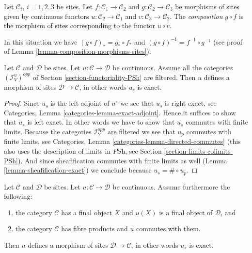 \begin{definition}
\label{definition-composition-morphisms-sites}
Let $\mathcal{C}_i$, $i = 1, 2, 3$ be sites. Let
$f : \mathcal{C}_1 \to \mathcal{C}_2$ and
$g : \mathcal{C}_2 \to \mathcal{C}_3$ be morphisms of sites
given by continuous functors $u : \mathcal{C}_2 \to \mathcal{C}_1$
and $v : \mathcal{C}_3 \to \mathcal{C}_2$. The {\it composition}
$g \circ f$ is the morphism of sites corresponding to the
functor $u \circ v$.
\end{definition}

\noindent
In this situation we have $(g \circ f)_* = g_* \circ f_*$ and
$(g \circ f)^{-1} = f^{-1} \circ g^{-1}$ (see proof of
Lemma \ref{lemma-composition-morphisms-sites}).

\begin{lemma}
\label{lemma-directed-morphism}
Let $\mathcal{C}$ and $\mathcal{D}$ be sites. Let
$u : \mathcal{C} \to \mathcal{D}$ be continuous.
Assume all the categories $(\mathcal{I}_V^u)^{opp}$ of
Section \ref{section-functoriality-PSh}
are filtered. Then $u$ defines a morphism of sites $\mathcal{D} \to
\mathcal{C}$, in other words $u_s$ is exact.
\end{lemma}

\begin{proof}
Since $u_s$ is the left adjoint of $u^s$ we see that $u_s$ is right
exact, see Categories, Lemma \ref{categories-lemma-exact-adjoint}.
Hence it suffices to show that $u_s$ is left exact. In other words
we have to show that $u_s$ commutes with finite limits.
Because the categories $\mathcal{I}_Y^{opp}$ are filtered
we see that $u_p$ commutes with finite limits, see
Categories, Lemma \ref{categories-lemma-directed-commutes}
(this also uses the description of limits in $\textit{PSh}$,
see Section \ref{section-limits-colimits-PSh}).
And since sheafification commutes with finite limits as well
(Lemma \ref{lemma-sheafification-exact}) we conclude because
$u_s = \# \circ u_p$.
\end{proof}

\begin{proposition}
\label{proposition-get-morphism}
Let $\mathcal{C}$ and $\mathcal{D}$ be sites. Let
$u : \mathcal{C} \to \mathcal{D}$ be continuous.
Assume furthermore the following:
\begin{enumerate}
\item the category $\mathcal{C}$ has a final object $X$ and
$u(X)$ is a final object of $\mathcal{D}$, and
\item the category $\mathcal{C}$ has fibre products and
$u$ commutes with them.
\end{enumerate}
Then $u$ defines a morphism of sites $\mathcal{D} \to
\mathcal{C}$, in other words $u_s$ is exact.
\end{proposition}

